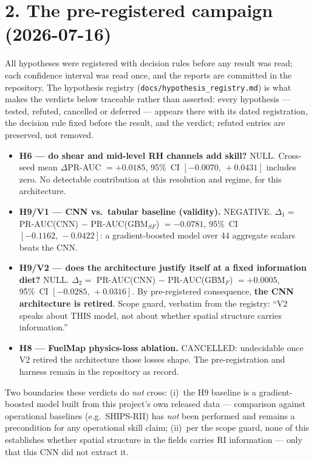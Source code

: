 \documentclass[11pt]{article}
\begin{document}
\section*{2. The pre-registered campaign (2026-07-16)}

All hypotheses were registered with decision rules before any result was
read; each confidence interval was read once, and the reports are
committed in the repository. The hypothesis registry
(\texttt{docs/hypothesis\_registry.md}) is what makes the verdicts below
traceable rather than asserted: every hypothesis --- tested, refuted,
cancelled or deferred --- appears there with its dated registration, the
decision rule fixed before the result, and the verdict; refuted entries
are preserved, not removed.

\begin{itemize}
  \item \textbf{H6 --- do shear and mid-level RH channels add skill?}
  NULL. Cross-seed mean $\Delta$PR-AUC $=+0.0185$, 95\%~CI
  $[-0.0070,\,+0.0431]$ includes zero. No detectable contribution at this
  resolution and regime, for this architecture.
  \item \textbf{H9/V1 --- CNN vs.\ tabular baseline (validity).} NEGATIVE.
  $\Delta_1=$ PR-AUC(CNN) $-$ PR-AUC(GBM$_{SF}$) $=-0.0781$, 95\%~CI
  $[-0.1162,\,-0.0422]$: a gradient-boosted model over 44 aggregate
  scalars beats the CNN.
  \item \textbf{H9/V2 --- does the architecture justify itself at a fixed
  information diet?} NULL. $\Delta_2=$ PR-AUC(CNN) $-$ PR-AUC(GBM$_F$)
  $=+0.0005$, 95\%~CI $[-0.0285,\,+0.0316]$. By pre-registered
  consequence, \textbf{the CNN architecture is retired}. Scope guard,
  verbatim from the registry: ``V2 speaks about THIS model, not about
  whether spatial structure carries information.''
  \item \textbf{H8 --- FuelMap physics-loss ablation.} CANCELLED:
  undecidable once V2 retired the architecture those losses shape. The
  pre-registration and harness remain in the repository as record.
\end{itemize}

Two boundaries these verdicts do \emph{not} cross: (i)~the H9 baseline is
a gradient-boosted model built from this project's own released data ---
comparison against operational baselines (e.g.\ SHIPS-RII) has \emph{not}
been performed and remains a precondition for any operational skill
claim; (ii)~per the scope guard, none of this establishes whether spatial
structure in the fields carries RI information --- only that this CNN did
not extract it.
\end{document}
